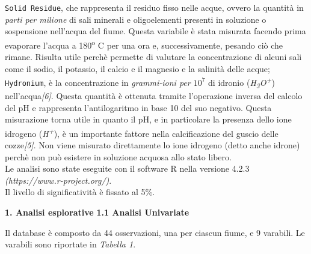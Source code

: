 \documentclass{article} %
\begin{document}
\texttt{Solid Residue}, che rappresenta il residuo fisso nelle acque, ovvero la quantità in \textit{parti per milione} di sali minerali e oligoelementi presenti in soluzione o sospensione nell'acqua del fiume. Questa variabile è stata misurata facendo prima evaporare l'acqua a 180\textsuperscript{o} C per una ora e, successivamente, pesando ciò che rimane. Risulta utile perchè permette di valutare la concentrazione di alcuni sali come il sodio, il potassio, il calcio e il magnesio e la salinità delle acque; 
\texttt{Hydronium}, è la concentrazione in \textit{grammi-ioni per $10^7$} di idronio (\textit{H\textsubscript{3}O\textsuperscript{+}}) nell'acqua\textit{[6]}. Questa quantità è ottenuta tramite l'operazione inversa del calcolo del pH e rappresenta l'antilogaritmo in base 10 del suo negativo. Questa misurazione torna utile in quanto il pH, e in particolare la presenza dello ione idrogeno (\textit{H\textsuperscript{+}}), è un importante fattore nella calcificazione del guscio delle cozze\textit{[5]}. Non viene misurato direttamente lo ione idrogeno (detto anche idrone) perchè non può esistere in soluzione acquosa allo stato libero. \\
Le analisi sono state eseguite con il software R nella versione 4.2.3 \\\textit{(https://www.r-project.org/)}.\\ Il livello di significatività è fissato al 5\%.


\begin{flushleft}
    \vskip 30pt
    \textbf{\Huge 1. \: Analisi esplorative}
    \vskip 30pt
    \textbf{\Large 1.1 \: Analisi Univariate}
\end{flushleft}
\vskip 10pt

Il database è composto da 44 osservazioni, una per ciascun fiume, e 9 varabili. 
Le varabili sono riportate in \textit{Tabella 1}.
\end{document}
